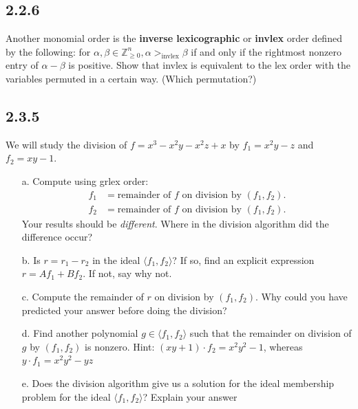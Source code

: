 \documentclass[]{article}
\newcommand\<{\langle}
\renewcommand\>{\rangle}
\newcommand{\ZZ}{\ensuremath{\mathbb{Z}}}
\begin{document}
\subsection*{2.2.6} Another monomial order is the \textbf{inverse lexicographic} or \textbf{invlex} order defined by the following: for $\alpha, \beta \in \ZZ_{\geq 0}^{n}, \alpha >_{\text{invlex}} \beta$ if and only if the rightmost nonzero entry of $\alpha - \beta$ is positive. Show that invlex is equivalent to the lex order with the variables permuted in a certain way. (Which permutation?)

\subsection*{2.3.5} We will study the division of $f = x^3 - x^2y - x^2z + x$ by $f_1 = x^2y-z$ and $f_2 = xy - 1$. 
\begin{enumerate}
	\item[a.] Compute using grlex order:
	\begin{align*}
		f_1 &= \text{remainder of $f$ on division by $\left(f_1, f_2\right)$.} \\
		f_2 &= \text{remainder of $f$ on division by $\left(f_1, f_2\right)$.}
	\end{align*}
	Your results should be \textit{different}. Where in the division algorithm did the difference occur?
	\item[b.] Is $r = r_1 - r_2$ in the ideal $\<f_1, f_2\>$? If so, find an explicit expression $r = Af_1 + Bf_2$. If not, say why not.
	\item[c.] Compute the remainder of $r$ on division by $\left(f_1, f_2\right)$. Why could you have predicted your answer before doing the division?
	\item[d.] Find another polynomial $g \in \<f_1, f_2\>$ such that the remainder on division of $g$ by $(f_1, f_2)$ is nonzero. Hint: $(xy + 1)\cdot f_2 = x^2y^2 - 1$, whereas $y\cdot f_1 = x^2y^2-yz$
	\item[e.] Does the division algorithm give us a solution for the ideal membership problem for the ideal $\<f_1, f_2\>$? Explain your answer
\end{enumerate}
\end{document}
